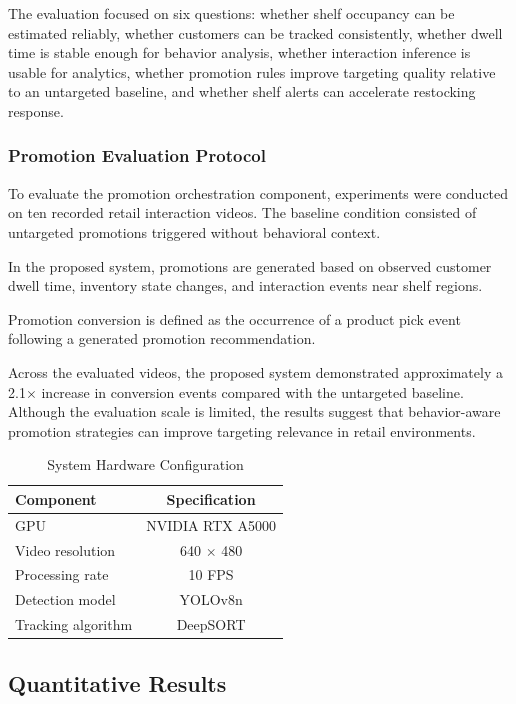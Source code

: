 \documentclass[conference]{IEEEtran}
\begin{document}
The evaluation focused on six questions: whether shelf occupancy can be estimated reliably, whether customers can be tracked consistently, whether dwell time is stable enough for behavior analysis, whether interaction inference is usable for analytics, whether promotion rules improve targeting quality relative to an untargeted baseline, and whether shelf alerts can accelerate restocking response.

\subsubsection{Promotion Evaluation Protocol}

To evaluate the promotion orchestration component, experiments were conducted on ten recorded retail interaction videos. The baseline condition consisted of untargeted promotions triggered without behavioral context.

In the proposed system, promotions are generated based on observed customer dwell time, inventory state changes, and interaction events near shelf regions.

Promotion conversion is defined as the occurrence of a product pick event following a generated promotion recommendation.

Across the evaluated videos, the proposed system demonstrated approximately a 2.1$\times$ increase in conversion events compared with the untargeted baseline. Although the evaluation scale is limited, the results suggest that behavior-aware promotion strategies can improve targeting relevance in retail environments.

\begin{table}[t]
\caption{System Hardware Configuration}
\centering
\begin{tabular}{l c}
\toprule
\textbf{Component} & \textbf{Specification} \\
\midrule
GPU & NVIDIA RTX A5000 \\
Video resolution & 640 $\times$ 480 \\
Processing rate & 10 FPS \\
Detection model & YOLOv8n \\
Tracking algorithm & DeepSORT \\
\bottomrule
\end{tabular}
\label{tab:hardware}
\end{table}

\subsection{Quantitative Results}
\end{document}
